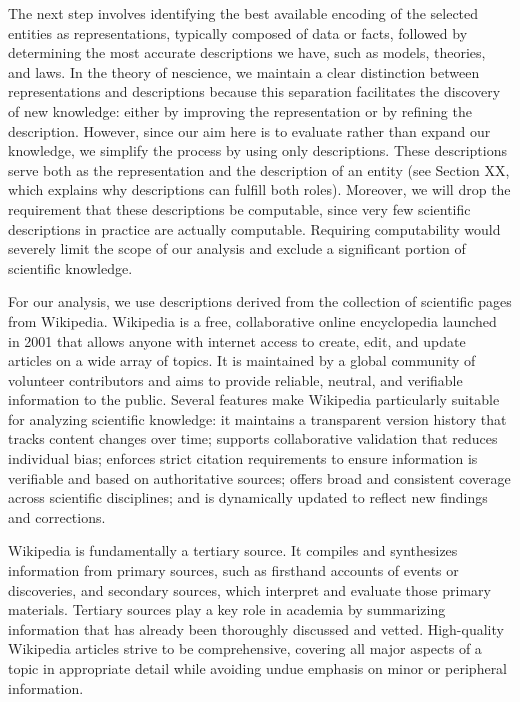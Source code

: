 The next step involves identifying the best available encoding of the selected entities as representations, typically composed of data or facts, followed by determining the most accurate descriptions we have, such as models, theories, and laws. In the theory of nescience, we maintain a clear distinction between representations and descriptions because this separation facilitates the discovery of new knowledge: either by improving the representation or by refining the description. However, since our aim here is to evaluate rather than expand our knowledge, we simplify the process by using only descriptions. These descriptions serve both as the representation and the description of an entity (see Section {\color{red} XX}, which explains why descriptions can fulfill both roles). Moreover, we will drop the requirement that these descriptions be computable, since very few scientific descriptions in practice are actually computable. Requiring computability would severely limit the scope of our analysis and exclude a significant portion of scientific knowledge.

For our analysis, we use descriptions derived from the collection of scientific pages from Wikipedia. Wikipedia is a free, collaborative online encyclopedia launched in 2001 that allows anyone with internet access to create, edit, and update articles on a wide array of topics. It is maintained by a global community of volunteer contributors and aims to provide reliable, neutral, and verifiable information to the public. Several features make Wikipedia particularly suitable for analyzing scientific knowledge: it maintains a transparent version history that tracks content changes over time; supports collaborative validation that reduces individual bias; enforces strict citation requirements to ensure information is verifiable and based on authoritative sources; offers broad and consistent coverage across scientific disciplines; and is dynamically updated to reflect new findings and corrections.

Wikipedia is fundamentally a tertiary source. It compiles and synthesizes information from primary sources, such as firsthand accounts of events or discoveries, and secondary sources, which interpret and evaluate those primary materials. Tertiary sources play a key role in academia by summarizing information that has already been thoroughly discussed and vetted. High-quality Wikipedia articles strive to be comprehensive, covering all major aspects of a topic in appropriate detail while avoiding undue emphasis on minor or peripheral information.

